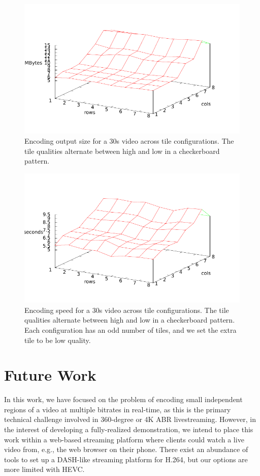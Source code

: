 \begin{figure}[t]
	\includegraphics[width=\columnwidth]{figures/Sizes.pdf}
	\caption{Encoding output size for a 30s video across tile configurations. The tile qualities alternate between high and low in a checkerboard pattern.}
\end{figure}

\begin{figure}[t]
	\includegraphics[width=\columnwidth]{figures/Times.pdf}
	\caption{Encoding speed for a 30s video across tile configurations. The tile qualities alternate between high and low in a checkerboard pattern. Each configuration has an odd number of tiles, and we set the extra tile to be low quality.}
\end{figure}

\section{Future Work}

In this work, we have focused on the problem of encoding small independent regions of a video at multiple bitrates in real-time, as this is the primary technical challenge involved in 360-degree or 4K ABR livestreaming. However, in the interest of developing a fully-realized demonstration, we intend to place this work within a web-based streaming platform where clients could watch a live video from, e.g., the web browser on their phone. There exist an abundance of tools to set up a DASH-like streaming platform for H.264, but our options are more limited with HEVC.

